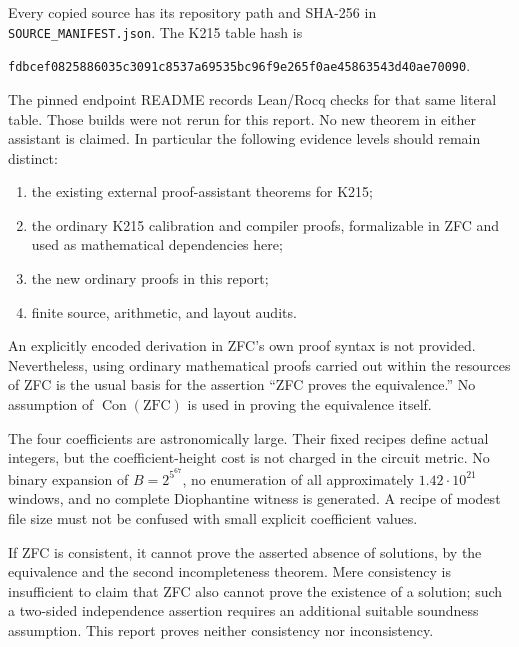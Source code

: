 \documentclass[11pt,a4paper]{article}
\theoremstyle{remark}\newtheorem{remark}[theorem]{Remark}
\newcommand{\Con}{\operatorname{Con}}
\newcommand{\src}[1]{\nolinkurl{#1}}
\begin{document}
Every copied source has its repository path and SHA-256 in
\src{SOURCE_MANIFEST.json}. The K215 table hash is
\begin{center}\footnotesize
\texttt{fdbcef0825886035c3091c8537a69535bc96f9e265f0ae45863543d40ae70090}.
\end{center}
The pinned endpoint README records Lean/Rocq checks for that same
literal table. Those builds were not rerun for this report. No new
theorem in either assistant is claimed. In particular the following
evidence levels should remain distinct:
\begin{enumerate}
\item the existing external proof-assistant theorems for K215;
\item the ordinary K215 calibration and compiler proofs, formalizable
      in ZFC and used as mathematical dependencies here;
\item the new ordinary proofs in this report;
\item finite source, arithmetic, and layout audits.
\end{enumerate}
An explicitly encoded derivation in ZFC's own proof syntax is not
provided. Nevertheless, using ordinary mathematical proofs carried
out within the resources of ZFC is the usual basis for the assertion
``ZFC proves the equivalence.'' No assumption of $\Con(\mathrm{ZFC})$
is used in proving the equivalence itself.

The four coefficients are astronomically large. Their fixed recipes
define actual integers, but the coefficient-height cost is not charged
in the circuit metric. No binary expansion of $B=2^{5^{67}}$, no
enumeration of all approximately $1.42\cdot10^{21}$ windows, and no
complete Diophantine witness is generated. A recipe of modest file
size must not be confused with small explicit coefficient values.

If ZFC is consistent, it cannot prove the asserted absence of
solutions, by the equivalence and the second incompleteness theorem.
Mere consistency is insufficient to claim that ZFC also cannot prove
the existence of a solution; such a two-sided independence assertion
requires an additional suitable soundness assumption. This report
proves neither consistency nor inconsistency.
\end{document}
